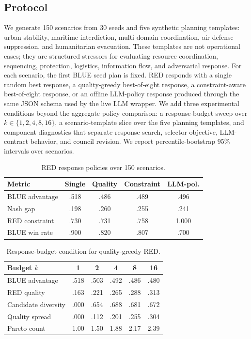 \documentclass[letterpaper]{article} %
\begin{document}
\subsection{Protocol}

We generate 150 scenarios from 30 seeds and five synthetic planning templates: urban stability, maritime interdiction, multi-domain coordination, air-defense suppression, and humanitarian evacuation. These templates are not operational cases; they are structured stressors for evaluating resource coordination, sequencing, protection, logistics, information flow, and adversarial response. For each scenario, the first BLUE seed plan is fixed. RED responds with a single random best response, a quality-greedy best-of-eight response, a constraint-aware best-of-eight response, or an offline LLM-policy response produced through the same JSON schema used by the live LLM wrapper. We add three experimental conditions beyond the aggregate policy comparison: a response-budget sweep over $k \in \{1,2,4,8,16\}$, a scenario-template slice over the five planning templates, and component diagnostics that separate response search, selector objective, LLM-contract behavior, and council revision. We report percentile-bootstrap 95\% intervals over scenarios.

\begin{table}[t]
\centering
\scriptsize
\caption{RED response policies over 150 scenarios.}
\label{tab:main}
\begin{tabular}{@{}lcccc@{}}
\toprule
Metric & Single & Quality & Constraint & LLM-pol. \\
\midrule
BLUE advantage & .518 & .486 & .489 & .496 \\
Nash gap & .198 & .260 & .255 & .241 \\
RED constraint & .730 & .731 & .758 & 1.000 \\
BLUE win rate & .900 & .820 & .807 & .700 \\
\bottomrule
\end{tabular}
\end{table}

\begin{table}[t]
\centering
\scriptsize
\caption{Response-budget condition for quality-greedy RED.}
\label{tab:budget}
\begin{tabular}{@{}lccccc@{}}
\toprule
Budget $k$ & 1 & 2 & 4 & 8 & 16 \\
\midrule
BLUE advantage & .518 & .503 & .492 & .486 & .480 \\
RED quality & .163 & .221 & .265 & .288 & .313 \\
Candidate diversity & .000 & .654 & .688 & .681 & .672 \\
Quality spread & .000 & .112 & .201 & .255 & .304 \\
Pareto count & 1.00 & 1.50 & 1.88 & 2.17 & 2.39 \\
\bottomrule
\end{tabular}
\end{table}
\end{document}
